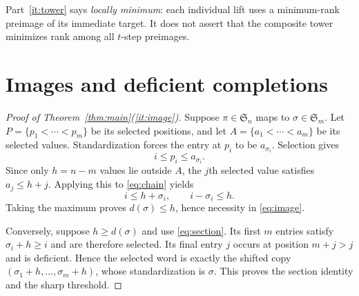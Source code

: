 \documentclass[a4paper,10pt]{amsart}
\theoremstyle{remark}
\newcommand{\Sym}{\mathfrak S}
\begin{document}
Part~\ref{it:tower} says \emph{locally minimum}: each individual lift uses a
minimum-rank preimage of its immediate target.  It does not assert that the
composite tower minimizes rank among all $t$-step preimages.

\section{Images and deficient completions}\label{sec:inverse}

\begin{proof}[Proof of Theorem~\ref{thm:main}(\ref{it:image})]
Suppose $\pi\in\Sym_n$ maps to $\sigma\in\Sym_m$.  Let
$P=\{p_1<\cdots<p_m\}$ be its selected positions, and let
$A=\{a_1<\cdots<a_m\}$ be its selected values.  Standardization forces the
entry at $p_i$ to be $a_{\sigma_i}$.  Selection gives
\begin{equation}\label{eq:chain}
 i\le p_i\le a_{\sigma_i}.
\end{equation}
Since only $h=n-m$ values lie outside $A$, the $j$th selected value satisfies
$a_j\le h+j$.  Applying this to \eqref{eq:chain} yields
\[
 i\le h+\sigma_i,\qquad i-\sigma_i\le h.
\]
Taking the maximum proves $d(\sigma)\le h$, hence necessity in
\eqref{eq:image}.

Conversely, suppose $h\ge d(\sigma)$ and use \eqref{eq:section}.  Its first
$m$ entries satisfy $\sigma_i+h\ge i$ and are therefore selected.  Its final
entry $j$ occurs at position $m+j>j$ and is deficient.  Hence the selected
word is exactly the shifted copy
$(\sigma_1+h,\ldots,\sigma_m+h)$, whose standardization is $\sigma$.
This proves the section identity and the sharp threshold.
\end{proof}
\end{document}

